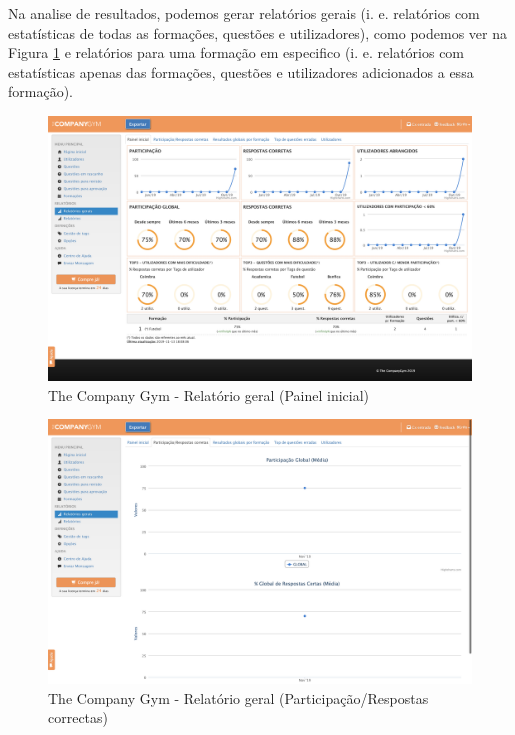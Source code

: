 \newpage

Na analise de resultados, podemos gerar relatórios gerais (i. e. relatórios com estatísticas de todas as formações, questões e utilizadores), como podemos ver na Figura \ref{fig:tcg-data}  e relatórios para uma formação em especifico (i. e. relatórios com estatísticas apenas das formações, questões e utilizadores adicionados a essa formação). 

\begin{figure}[ht!]
	\begin{center}
		\includegraphics[width=1\textwidth]{img/tcg/tcg-data.png}
		\caption{The Company Gym - Relatório geral (Painel inicial)}
		\label{fig:tcg-data}
	\end{center}
\end{figure}

\newpage

\begin{figure}[ht!]
	\begin{center}
		\includegraphics[width=1\textwidth]{img/tcg/tcg-data1.png}
		\caption{The Company Gym - Relatório geral (Participação/Respostas correctas)}
		\label{fig:tcg-data1}
	\end{center}
\end{figure}

